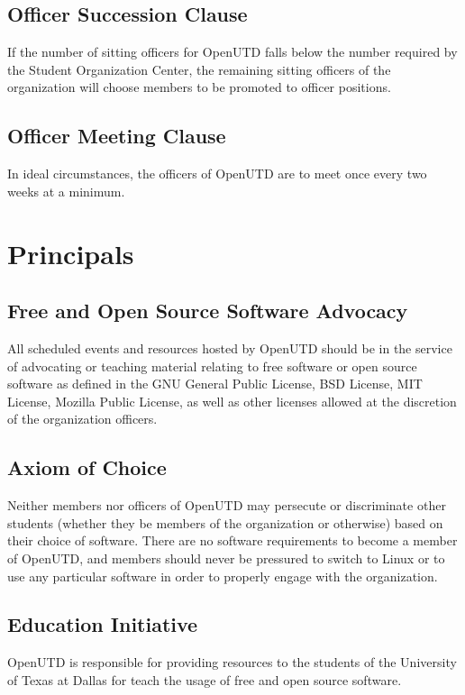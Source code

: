 \documentclass{constitution}
\begin{document}
\subsection{Officer Succession Clause}
If the number of sitting officers for OpenUTD falls below the number required by the Student Organization Center, the remaining sitting officers of the organization will choose members to be promoted to officer positions.

\subsection{Officer Meeting Clause}
In ideal circumstances, the officers of OpenUTD are to meet once every two weeks at a minimum.

\section{Principals}

\subsection{Free and Open Source Software Advocacy}
All scheduled events and resources hosted by OpenUTD should be in the service of advocating or teaching material relating to free software or open source software as defined in the GNU General Public License, BSD License, MIT License, Mozilla Public License, as well as other licenses allowed at the discretion of the organization officers.

\subsection{Axiom of Choice \color{Gold}} Neither members nor officers of OpenUTD may persecute or discriminate other students (whether they be members of the organization or otherwise) based on their choice of software.
There are no software requirements to become a member of OpenUTD, and members should never be pressured to switch to Linux or to use any particular software in order to properly engage with the organization.

\subsection{Education Initiative}
OpenUTD is responsible for providing resources to the students of the University of Texas at Dallas for teach the usage of free and open source software.
\end{document}
